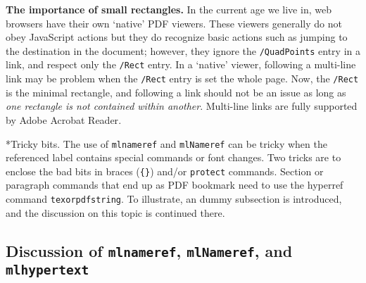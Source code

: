 \documentclass{article}
\makeatletter
\def\darg#1{\texttt{\{#1\}}}
\let\pkg\textsf
\let\app\textsf
\def\cs#1{\texttt{\@backslashchar#1}}
\renewcommand{\paragraph}
    {\@startsection{paragraph}{4}{0pt}{6pt}{-3pt}{\bfseries}}
\makeatother
\begin{document}
\textbf{The importance of small rectangles.} In the current age we live in,
web browsers have their own `native' PDF viewers. These viewers generally do
not obey JavaScript actions but they do recognize basic actions such as
jumping to the destination in the document; however, they ignore the
\texttt{/QuadPoints} entry in a link, and respect only the \texttt{/Rect}
entry. In a `native' viewer, following a multi-line link may be problem when
the \texttt{/Rect} entry is set the whole page. Now, the \texttt{/Rect} is
the minimal rectangle, and following a link should not be an issue as long as
\emph{one rectangle is not contained within another}. Multi-line links are
fully supported by \app{Adobe Acrobat Reader}.

\paragraph*{Tricky bits.} The use of \cs{mlnameref} and \cs{mlNameref} can be tricky when
the referenced label contains special commands or font changes. Two tricks
are to enclose the bad bits in braces (\texttt{\darg{}}) and/or \cs{protect}
commands. Section or paragraph commands that end up as PDF bookmark need to use
the \pkg{hyperref} command \cs{texorpdfstring}. To illustrate, an dummy subsection
is introduced, and the discussion on this topic is continued there.


\subsection{Discussion of \texorpdfstring
  {{\protect\cs{mlnameref}}, {\protect\cs{mlNameref}}, and {\protect\cs{mlhypertext}}}
  {\textbackslash{mlnameref}, \textbackslash{mlNameref}, and \textbackslash{mlhypertext}}}\label{ss:probs}
\end{document}
